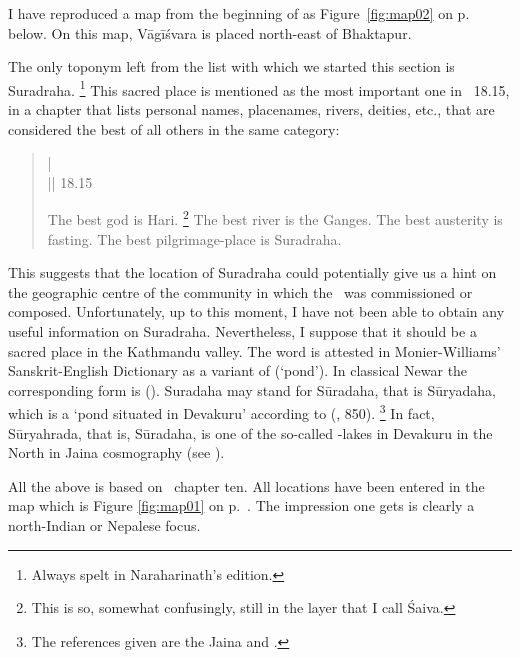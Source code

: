 \noindent
I have reproduced a map from the beginning of 
 as Figure~\ref{fig:map02}
on p.~\pageref{fig:map02} below. On this map, Vāgīśvara is placed north-east 
of Bhaktapur. 

The only toponym left from the list with which
we started this section is Suradraha.%
	\footnote{Always spelt  in Naraharinath's
			edition.}
This sacred place is mentioned as the most important
one in \VSS\ 18.15, in a chapter that lists personal names,
placenames, rivers, deities, etc., that are considered the
best  of all others in the same category:

\begin{quote}
 |\\
 || 18.15 

The best god is Hari.%
		\footnote{This is so, somewhat confusingly, still in the
		layer that I call Śaiva.}
The best river is the Ganges.
The best austerity is fasting. The best pilgrimage-place is Suradraha.
\end{quote}

\noindent
This suggests that the location of Suradraha could potentially
give us a hint on the geographic centre of 
the community in which the \VSS\ was commissioned
or composed. Unfortunately, up to this moment, I have
not been able to obtain any useful information on Suradraha. Nevertheless,
I suppose that it should be  a sacred place in the 
Kathmandu valley. The word  is attested in
Monier-Williams' Sanskrit-English Dictionary 
as a variant of  (`pond').
In classical Newar the corresponding form is 
(). Suradaha may stand for Sūradaha,
that is Sūryadaha, which is a `pond situated in Devakuru' 
according to \citeauthor{PrakritProperNames2} (\citeyear{PrakritProperNames2}, 850).%
	\footnote{The references given are the Jaina 
			 and .} 
In fact, Sūryahrada, that is, Sūradaha, is one of the 
so-called -lakes in Devakuru in the North
in Jaina cosmography (see ).
 
All the above is based on \VSS\ chapter ten. All locations have
 been entered in the map which is Figure \ref{fig:map01} on
 p.~\pageref{fig:map01}.
 The impression one gets is clearly a north-Indian or
 Nepalese focus.
 
